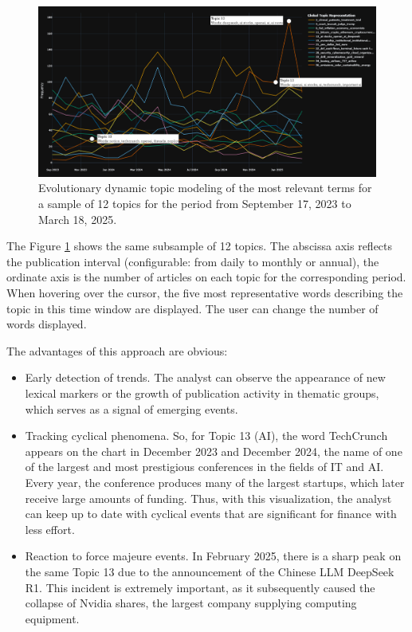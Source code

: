 \begin{figure}[H]
    \centering
    \includegraphics[width=1\linewidth]{img/dynamic_topic_modeling.png}
    \caption{Evolutionary dynamic topic modeling of the most relevant terms
    for a sample of 12 topics for the period from September 17, 2023
    to March 18, 2025.}
    \label{fig:dtm}
\end{figure}

The Figure \ref{fig:dtm} shows the same subsample of 12 topics. The abscissa axis reflects the publication
interval (configurable: from daily to monthly or annual), the ordinate axis is the number of articles on each
topic for the corresponding period. When hovering over the cursor, the five most representative words describing
the topic in this time window are displayed. The user can change the number of words displayed.

The advantages of this approach are obvious:

\begin{itemize}
    \item Early detection of trends. The analyst can observe the appearance of new lexical markers or the growth
    of publication activity in thematic groups, which serves as a signal of emerging events.
    \item Tracking cyclical phenomena. So, for Topic 13 (AI), the word TechCrunch appears on the chart in December
    2023 and December 2024, the name of one of the largest and most prestigious conferences in the fields of IT and AI.
    Every year, the conference produces many of the largest startups, which later receive large amounts of funding.
    Thus, with this visualization, the analyst can keep up to date with cyclical events that are significant for finance
    with less effort.
    \item Reaction to force majeure events. In February 2025, there is a sharp peak on the same Topic 13 due
    to the announcement of the Chinese LLM DeepSeek R1. This incident is extremely important, as it subsequently
    caused the collapse of Nvidia shares, the largest company supplying computing equipment.
\end{itemize}


